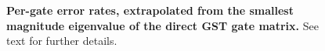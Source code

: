{\begin{figure}
\begin{center}
\caption{\textbf{Per-gate error rates, extrapolated from the smallest magnitude eigenvalue of the direct GST gate matrix.}  See text for further details.\label{smallEigvalErrRateColorBoxPlot}}
\end{center}
\end{figure}


}{}


